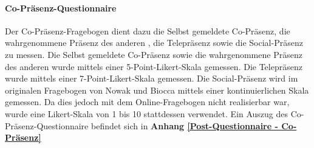 \documentclass[a4paper,11pt]{article}%
\renewcommand{\\}{\vspace*{0.5\baselineskip} \newline}
\begin{document}
		\paragraph{Co-Präsenz-Questionnaire}
Der Co-Präsenz-Fragebogen dient dazu die Selbst gemeldete Co-Präsenz, die wahrgenommene Präsenz des \flqq anderen \frqq, die Telepräsenz sowie die Social-Präsenz zu messen. Die Selbst gemeldete Co-Präsenz sowie die wahrgenommene Präsenz des \flqq anderen \frqq wurde mittels einer 5-Point-Likert-Skala gemessen. Die Telepräsenz wurde mittels einer 7-Point-Likert-Skala gemessen. Die Social-Präsenz wird im originalen Fragebogen von Nowak und Biocca mittels einer kontinuierlichen Skala gemessen. Da dies jedoch mit dem Online-Fragebogen nicht realisierbar war, wurde eine Likert-Skala von 1 bis 10 stattdessen verwendet. \citep[p.487]{nowak2004effect}
\\Ein Auszug des Co-Präsenz-Questionnaire befindet sich in \textbf{Anhang \ref{Post-Questionnaire - Co-Präsenz}}
\end{document}
